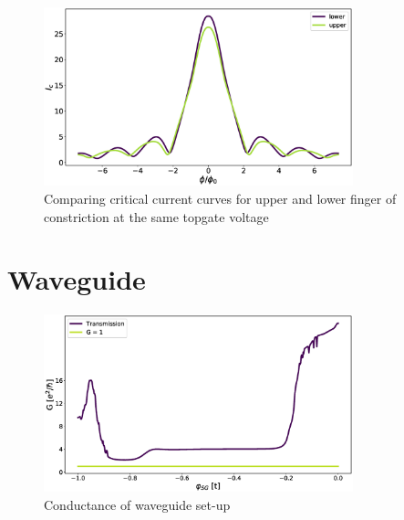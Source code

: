 \documentclass[a4paper]{article}
\begin{document}
\begin{figure}[h!]
\centering
\includegraphics[width=0.8\textwidth]{hb_comparison}
\caption{Comparing critical current curves for upper and lower finger of constriction at the same topgate voltage}
\end{figure}
\newpage

\section{Waveguide}

\begin{figure}[h!]
\centering
\includegraphics[width=0.8\textwidth]{wg-conductance}
\caption{Conductance of waveguide set-up}
\end{figure}
\end{document}
